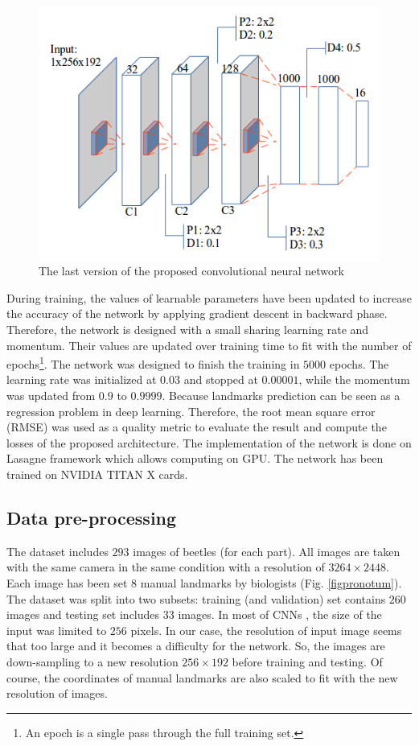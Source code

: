 \documentclass[10pt]{article}
\begin{document}
\begin{figure}[htbp]
\centering
\includegraphics[scale=0.4]{images/architecture3}
\caption{The last version of the proposed convolutional neural network} 
\label{cnnnetwork2}
\end{figure}

During training, the values of learnable parameters have been updated to increase the accuracy of the network by applying gradient descent in backward phase. Therefore, the network is designed with a small sharing learning rate and momentum. Their values are updated over training time to fit with the number of epochs\footnote{An epoch is a single pass through the full training set.}. The network was designed to finish the training in $5000$ epochs. The learning rate was initialized at $0.03$ and stopped at $0.00001$, while the momentum was updated from $0.9$ to $0.9999$. 
Because landmarks prediction can be seen as a regression problem in deep learning. Therefore, the root mean square error (RMSE) was used as a quality metric to evaluate the result and compute the losses of the proposed architecture. The implementation of the network is done on Lasagne framework \cite{lasagne} which allows computing on GPU. The network has been trained on NVIDIA TITAN X cards.

\subsection{Data pre-processing}
\label{sec_data}
The dataset includes $293$ images of beetles (for each part). All images are taken with the same camera in the same condition with a resolution of $3264 \times 2448$. Each image has been set $8$ manual landmarks by biologists (Fig. \ref{figpronotum}). The dataset was split into two subsets: training (and validation) set contains $260$ images and testing set includes $33$ images. In most of CNNs \cite{lecun2010convolutional, sun2013deep,  krizhevsky2012imagenet, cintas2016automatic}, the size of the input was limited to $256$ pixels. In our case, the resolution of input image seems that too large and it becomes a difficulty for the network. So, the images are down-sampling to a new resolution $256 \times 192$ before training and testing. Of course, the coordinates of manual landmarks are also scaled to fit with the new resolution of images.
\end{document}
